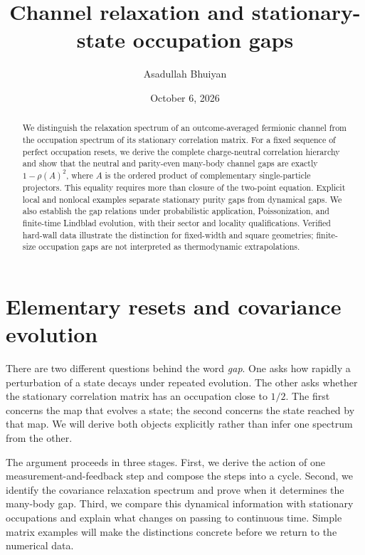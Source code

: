 \documentclass[aps,prb,onecolumn,nofootinbib,superscriptaddress,floatfix]{revtex4-2}
\begin{document}
\title{Channel relaxation and stationary-state occupation gaps}
\author{Asadullah Bhuiyan}
\noaffiliation
\date{October 6, 2026}
\begin{abstract}
We distinguish the relaxation spectrum of an outcome-averaged fermionic
channel from the occupation spectrum of its stationary correlation
matrix. For a fixed sequence of perfect occupation resets, we derive
the complete charge-neutral correlation hierarchy and show that the
neutral and parity-even many-body channel gaps are exactly
$1-\rho(A)^2$, where $A$ is the ordered product of complementary
single-particle projectors. This equality requires more than closure
of the two-point equation. Explicit local and nonlocal examples
separate stationary purity gaps from dynamical gaps. We also establish
the gap relations under probabilistic application, Poissonization, and
finite-time Lindblad evolution, with their sector and locality
qualifications. Verified hard-wall data illustrate the distinction
for fixed-width and square geometries; finite-size occupation gaps
are not interpreted as thermodynamic extrapolations.
\end{abstract}
\maketitle
\setcounter{tocdepth}{0}
\makeatletter
\let\l@subsection\@gobbletwo
\makeatother
\tableofcontents
\appendix

\section{Elementary resets and covariance evolution}
\label{sec:reset}
There are two different questions behind the word \emph{gap}. One asks
how rapidly a perturbation of a state decays under repeated evolution.
The other asks whether the stationary correlation matrix has an
occupation close to $1/2$. The first concerns the map that evolves a
state; the second concerns the state reached by that map. We will
derive both objects explicitly rather than infer one spectrum from
the other.

The argument proceeds in three stages. First, we derive the action
of one measurement-and-feedback step and compose the steps into a
cycle. Second, we identify the covariance relaxation spectrum and
prove when it determines the many-body gap. Third, we compare this
dynamical information with stationary occupations and explain what
changes on passing to continuous time. Simple matrix examples will
make the distinctions concrete before we return to the numerical data.
\end{document}
